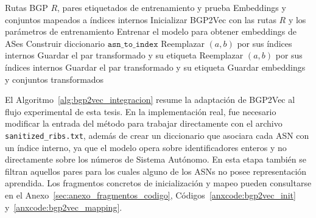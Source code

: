 %
\begin{algorithm}[H]
\caption{Integración de BGP2Vec y mapeo de ASNs a índices}
\label{alg:bgp2vec_integracion}
\begin{algorithmic}[1]
\Require Rutas BGP $R$, pares etiquetados de entrenamiento y prueba
\Ensure Embeddings y conjuntos mapeados a índices internos
\State Inicializar BGP2Vec con las rutas $R$ y los parámetros de entrenamiento
\State Entrenar el modelo para obtener embeddings de ASes
\State Construir diccionario $\texttt{asn\_to\_index}$
        \State Reemplazar $(a,b)$ por sus índices internos
        \State Guardar el par transformado y su etiqueta
    \EndIf
\EndFor
{}
        \State Reemplazar $(a,b)$ por sus índices internos
        \State Guardar el par transformado y su etiqueta
    \EndIf
\EndFor
\State Guardar embeddings y conjuntos transformados
\end{algorithmic}
\end{algorithm}

El Algoritmo~\ref{alg:bgp2vec_integracion} resume la adaptación de BGP2Vec al flujo experimental de esta tesis. En la implementación real, fue necesario modificar la entrada del método para trabajar directamente con el archivo \texttt{sanitized\_ribs.txt}, además de crear un diccionario que asociara cada ASN con un índice interno, ya que el modelo opera sobre identificadores enteros y no directamente sobre los números de Sistema Autónomo. En esta etapa también se filtran aquellos pares para los cuales alguno de los ASNs no posee representación aprendida. Los fragmentos concretos de inicialización y mapeo pueden consultarse en el Anexo~\ref{sec:anexo_fragmentos_codigo}, Códigos~\ref{anxcode:bgp2vec_init} y~\ref{anxcode:bgp2vec_mapping}.


                   
